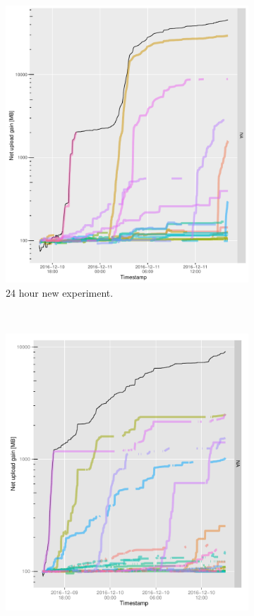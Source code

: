 \begin{figure}[h!]
	\begin{adjustwidth}{-2.5cm}{}
		\begin{subfigure}[t]{0.7\textwidth}
			\centering
			\includegraphics[width=\textwidth]{pics/results/b136.pdf}
			\caption{24 hour new experiment.}
		\end{subfigure}
		~
		\begin{subfigure}[t]{0.7\textwidth}
			\centering
			\includegraphics[width=\textwidth]{pics/results/m138.pdf}

\end{subfigure}
\end{adjustwidth}
\end{figure}
